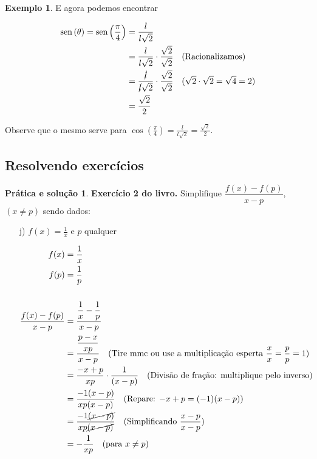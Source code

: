 \documentclass[12pt,openright,twoside,a4paper]{article}
\theoremstyle{definition}
\newtheorem{example}{Exemplo}[section]
\newtheorem{practice}{Prática e solução}[section]
\renewcommand{\sin}{\operatorname{sen}} %
\begin{document}
\begin{example}
		E agora podemos encontrar
		
		\begin{align*}
			\sin{(\theta)} = \sin{\left(\frac{\pi}{4}\right)} &= \frac{l}{l\sqrt{2}}\\
			&= \frac{l}{l\sqrt{2}} \cdot \frac{\sqrt{2}}{\sqrt{2}} \quad \text{(Racionalizamos)}\\
			&= \frac{\cancel{l}}{\cancel{l}\sqrt{2}} \cdot \frac{\sqrt{2}}{\sqrt{2}} \quad \text{($\sqrt{2} \cdot \sqrt{2} = \sqrt{4} = 2$)}\\
			&= \frac{\sqrt{2}}{2}
		\end{align*}
		
		Observe que o mesmo serve para $\displaystyle \cos{\left(\frac{\pi}{4}\right)} = \frac{l}{l\sqrt{2}} = \frac{\sqrt{2}}{2}$.
		
	\end{example}
	
	\subsection{Resolvendo exercícios}
	
	\begin{practice}
		\textbf{Exercício 2 do livro.} Simplifique $\dfrac{f(x) - f(p)}{x - p}$, $(x \neq p)$ sendo dados:
		
		\begin{enumerate}
			\item[j)] $f(x) = \displaystyle \frac{1}{x}$ e $p$ qualquer
			
			\begin{align*}
				f(x) &= \dfrac{1}{x} \\
				f(p) &= \dfrac{1}{p} \\
				\\
				\dfrac{f(x) - f(p)}{x - p} &= \dfrac{\dfrac{1}{x} - \dfrac{1}{p}}{x - p} \\
				&= \dfrac{\dfrac{p - x}{xp}}{x - p} \quad \text{(Tire mmc ou use a multiplicação esperta $\dfrac{x}{x} = \dfrac{p}{p} = 1$)}\\
				&= \dfrac{-x + p}{xp}\cdot \frac{1}{(x - p)} \quad \text{(Divisão de fração: multiplique pelo inverso)}\\
				&= \dfrac{-1(x - p)}{xp(x - p)} \quad \text{(Repare: $-x + p = (-1)(x - p)$)}\\
				&= \dfrac{-1\cancel{(x - p)}}{xp \cancel{(x - p)}} \quad \text{(Simplificando $\dfrac{x-p}{x-p}$)}\\
				&= -\dfrac{1}{xp} \quad \text{(para } x \ne p\text{)}
			\end{align*}
			
		\end{enumerate}
	\end{practice}
\end{document}
